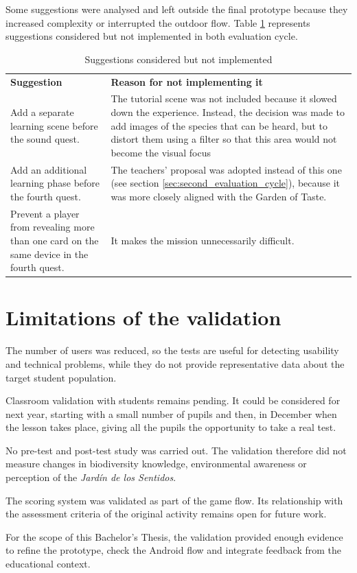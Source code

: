 Some suggestions were analysed and left outside the final prototype because they increased complexity or interrupted the outdoor flow. Table \ref{tab:not_implemented_suggestions} represents suggestions considered but not implemented in both evaluation cycle.

\begin{table}[H]
\centering
\caption{Suggestions considered but not implemented}
\label{tab:not_implemented_suggestions}
\renewcommand{\arraystretch}{1.4}
\begin{tabular}{>{\raggedright\arraybackslash}p{}
                >{\raggedright\arraybackslash}p{}}
\rowcolor[HTML]{B0C9B0}
\textbf{Suggestion} & \textbf{Reason for not implementing it} \\
\rowcolor[HTML]{F0F5F0}
Add a separate learning scene before the sound quest. & The tutorial scene was not included because it slowed down the experience. Instead, the decision was made to add images of the species that can be heard, but to distort them using a filter so that this area would not become the visual focus \\
\rowcolor[HTML]{F0F5F0}
Add an additional learning phase before the fourth quest. & The teachers’ proposal was adopted instead of this one (see section \ref{sec:second_evaluation_cycle}), because it was more closely aligned with the Garden of Taste. \\
\rowcolor[HTML]{DFE8DF}
Prevent a player from revealing more than one card on the same device in the fourth quest. & It makes the mission unnecessarily difficult. \\
\end{tabular}
\end{table}




\section{Limitations of the validation}

The number of users was reduced, so the tests are useful for detecting usability and technical problems, while they do not provide representative data about the target student population.

Classroom validation with students remains pending. It could be considered for next year, starting with a small number of pupils and then, in December when the lesson takes place, giving all the pupils the opportunity to take a real test.

No pre-test and post-test study was carried out. The validation therefore did not measure changes in biodiversity knowledge, environmental awareness or perception of the \textit{Jardín de los Sentidos}.

The scoring system was validated as part of the game flow. Its relationship with the assessment criteria of the original activity remains open for future work.

For the scope of this Bachelor’s Thesis, the validation provided enough evidence to refine the prototype, check the Android flow and integrate feedback from the educational context.
